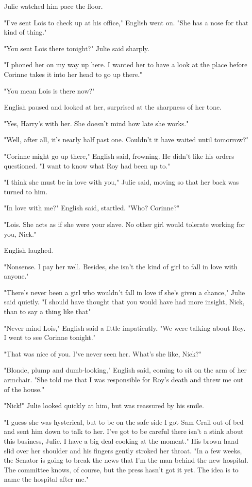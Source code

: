 \documentclass{novel}
\begin{document}
Julie watched him pace the floor.

"I've sent Lois to check up at his office," English went on. "She has a nose for that kind of thing."

"You sent Lois there tonight?" Julie said sharply.

"I phoned her on my way up here. I wanted her to have a look at the place before Corinne takes it into her head to go up there."

"You mean Lois is there now?"

English paused and looked at her, surprised at the sharpness of her tone.

"Yes, Harry's with her. She doesn't mind how late she works."

"Well, after all, it's nearly half past one. Couldn't it have waited until tomorrow?"

"Corinne might go up there," English said, frowning. He didn't like his orders questioned. "I want to know what Roy had been up to."

"I think she must be in love with you," Julie said, moving so that her back was turned to him.

"In love with me?" English said, startled. "Who? Corinne?"

"Lois. She acts as if she were your slave. No other girl would tolerate working for you, Nick."

English laughed.

"Nonsense. I pay her well. Besides, she isn't the kind of girl to fall in love with anyone."

"There's never been a girl who wouldn't fall in love if she's given a chance," Julie said quietly. "I should have thought that you would have had more insight, Nick, than to say a thing like that"

"Never mind Lois," English said a little impatiently. "We were talking about Roy. I went to see Corinne tonight."

"That was nice of you. I've never seen her. What's she like, Nick?"

"Blonde, plump and dumb-looking," English said, coming to sit on the arm of her armchair. "She told me that I was responsible for Roy's death and threw me out of the house."

"Nick!" Julie looked quickly at him, but was reassured by his smile.

"I guess she was hysterical, but to be on the safe side I got Sam Crail out of bed and sent him down to talk to her. I've got to be careful there isn't a stink about this business, Julie. I have a big deal cooking at the moment." His brown hand slid over her shoulder and his fingers gently stroked her throat. "In a few weeks, the Senator is going to break the news that I'm the man behind the new hospital. The committee knows, of course, but the press hasn't got it yet. The idea is to name the hospital after me."
\end{document}
